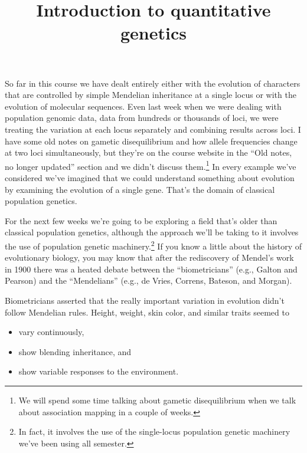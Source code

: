 \documentclass[12pt]{article}
\title{Introduction to quantitative genetics}
\begin{document}
\maketitle

\thispagestyle{first}

So far in this course we have dealt entirely either with the evolution
of characters that are controlled by simple Mendelian inheritance at a
single locus or with the evolution of molecular sequences. Even last
week when we were dealing with population genomic data, data from
hundreds or thousands of loci, we were treating the variation at each
locus separately and combining results across loci. I have some old
notes on gametic disequilibrium and how allele frequencies change at
two loci simultaneously, but they're on the course website in the
``Old notes, no longer updated'' section and we didn't discuss
them.\footnote{We will spend some time talking about gametic
  disequilibrium when we talk about association mapping in a couple of
  weeks.} In every example we've considered we've imagined that we
could understand something about evolution by examining the evolution
of a single gene. That's the domain of classical population genetics.

For the next few weeks we're going to be exploring a field that's
older than classical population genetics, although the approach we'll
be taking to it involves the use of population genetic
machinery.\footnote{In fact, it involves the use of the single-locus
  population genetic machinery we've been using all semester.} If you
know a little about the history of evolutionary biology, you may know
that after the rediscovery of Mendel's work in 1900 there was a heated
debate between the ``biometricians'' (e.g., Galton and Pearson) and
the ``Mendelians'' (e.g., de Vries, Correns, Bateson, and
Morgan).

Biometricians asserted that the really important variation in
evolution didn't follow Mendelian rules. Height, weight, skin color,
and similar traits seemed to

\begin{itemize}

\item vary continuously,

\item show blending inheritance, and

\item show variable responses to the environment.

\end{itemize}
\end{document}
